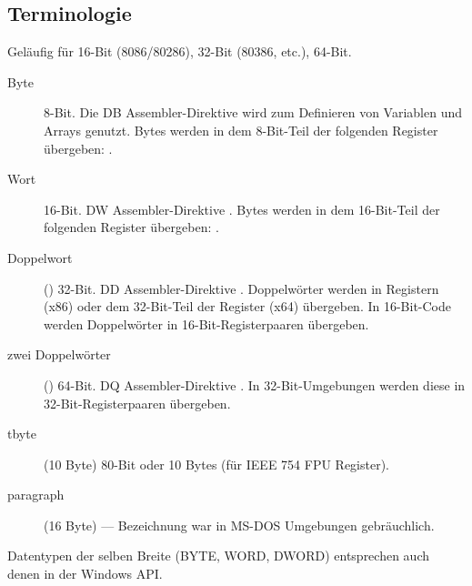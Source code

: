 
\subsection{Terminologie}

Geläufig für 16-Bit (8086/80286), 32-Bit (80386, etc.), 64-Bit.

\begin{description}
	\item[Byte] 8-Bit.
		Die DB Assembler-Direktive wird zum Definieren von Variablen und Arrays genutzt.
		Bytes werden in dem 8-Bit-Teil der folgenden Register übergeben:
		.
	\item[Wort] 16-Bit.
		DW Assembler-Direktive \dittoclosing.
		Bytes werden in dem 16-Bit-Teil der folgenden Register übergeben:
			.
	\item[Doppelwort] () 32-Bit.
		DD Assembler-Direktive \dittoclosing.
		Doppelwörter werden in Registern (x86) oder dem 32-Bit-Teil der Register (x64) übergeben.
		In 16-Bit-Code werden Doppelwörter in 16-Bit-Registerpaaren übergeben.
	\item[zwei Doppelwörter] () 64-Bit.
		DQ Assembler-Direktive \dittoclosing.
		In 32-Bit-Umgebungen werden diese in 32-Bit-Registerpaaren übergeben.
	\item[tbyte] (10 Byte) 80-Bit oder 10 Bytes (für IEEE 754 FPU Register).
	\item[paragraph] (16 Byte) --- Bezeichnung war in MS-DOS Umgebungen gebräuchlich.
\end{description}


Datentypen der selben Breite (BYTE, WORD, DWORD) entsprechen auch denen in der Windows \ac{API}.

